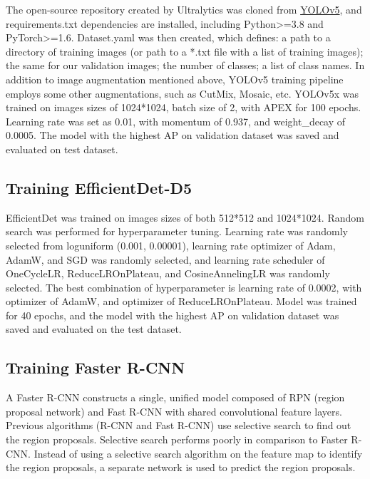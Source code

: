 \documentclass[utf8]{frontiersSCNS} %
\begin{document}
The open-source repository created by Ultralytics was cloned from \href{https://github.com/ultralytics/yolov5}{YOLOv5}, and requirements.txt dependencies are installed, including Python>=3.8 and PyTorch>=1.6. Dataset.yaml was then created, which defines: a path to a directory of training images (or path to a *.txt file with a list of training images); the same for our validation images; the number of classes;  a list of class names. In addition to image augmentation mentioned above, YOLOv5 training pipeline employs some other augmentations, such as CutMix, Mosaic, etc. YOLOv5x was trained on images sizes of 1024*1024, batch size of 2, with APEX for 100 epochs. Learning rate was set as 0.01, with momentum of 0.937, and weight\_decay of 0.0005. The model with the highest AP on validation dataset was saved and evaluated on test dataset.

\subsection{Training EfficientDet-D5}
EfficientDet was trained on images sizes of both 512*512 and 1024*1024. Random search was performed for hyperparameter tuning. Learning rate was randomly selected from loguniform (0.001, 0.00001), learning rate optimizer of Adam, AdamW, and SGD was randomly selected, and learning rate scheduler of OneCycleLR, ReduceLROnPlateau, and CosineAnnelingLR was randomly selected. The best combination of hyperparameter is learning rate of 0.0002, with optimizer of AdamW, and optimizer of ReduceLROnPlateau. Model was trained for 40 epochs, and the model with the highest AP on validation dataset was saved and evaluated on the test dataset.

\subsection{Training Faster R-CNN}
A Faster R-CNN constructs a single, unified model composed of RPN (region proposal network) and Fast R-CNN with shared convolutional feature layers.  Previous algorithms (R-CNN and Fast R-CNN) use selective search to find out the region proposals. Selective search performs poorly in comparison to Faster R-CNN.  Instead of using a selective search algorithm on the feature map to identify the region proposals, a separate network is used to predict the region proposals.
\end{document}
